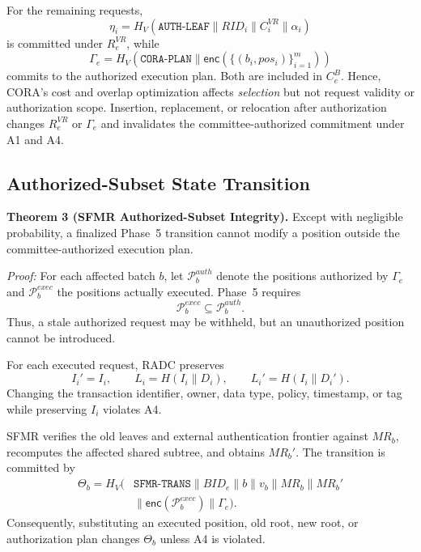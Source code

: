 \documentclass[lettersize,journal]{IEEEtran}
\begin{document}
For the remaining requests,
\begin{equation}
\eta_i=
H_V(\texttt{AUTH-LEAF}\parallel RID_i
\parallel C_i^{VR}\parallel\alpha_i)
\end{equation}
is committed under $R_e^{VR}$, while
\begin{equation}
\Gamma_e=
H_V(\texttt{CORA-PLAN}\parallel
\mathsf{enc}(\{(b_i,pos_i)\}_{i=1}^{m}))
\end{equation}
commits to the authorized execution plan. Both are included in
$C_e^B$. Hence, CORA's cost and overlap optimization affects
\emph{selection} but not request validity or authorization scope.
Insertion, replacement, or relocation after authorization changes
$R_e^{VR}$ or $\Gamma_e$ and invalidates the committee-authorized
commitment under A1 and A4.

\subsection{Authorized-Subset State Transition}

\textbf{Theorem 3 (SFMR Authorized-Subset Integrity).}
Except with negligible probability, a finalized Phase~5 transition
cannot modify a position outside the committee-authorized execution
plan.

\emph{Proof:}
For each affected batch $b$, let
$\mathcal{P}_b^{auth}$ denote the positions authorized by
$\Gamma_e$ and $\mathcal{P}_b^{exec}$ the positions actually executed.
Phase~5 requires
\begin{equation}
\mathcal{P}_b^{exec}\subseteq\mathcal{P}_b^{auth}.
\label{eq:sec_subset}
\end{equation}
Thus, a stale authorized request may be withheld, but an unauthorized
position cannot be introduced.

For each executed request, RADC preserves
\begin{equation}
I_i'=I_i,
\qquad
L_i=H(I_i\parallel D_i),
\qquad
L_i'=H(I_i\parallel D_i').
\end{equation}
Changing the transaction identifier, owner, data type, policy,
timestamp, or tag while preserving $I_i$ violates A4.

SFMR verifies the old leaves and external authentication frontier
against $MR_b$, recomputes the affected shared subtree, and obtains
$MR_b'$. The transition is committed by
\begin{equation}
\begin{aligned}
\Theta_b=H_V(&\texttt{SFMR-TRANS}\parallel BID_e\parallel b
\parallel v_b\parallel MR_b\parallel MR_b'\\
&\parallel\mathsf{enc}(\mathcal{P}_b^{exec})
\parallel\Gamma_e).
\end{aligned}
\label{eq:sec_theta}
\end{equation}
Consequently, substituting an executed position, old root, new root,
or authorization plan changes $\Theta_b$ unless A4 is violated.
\end{document}
